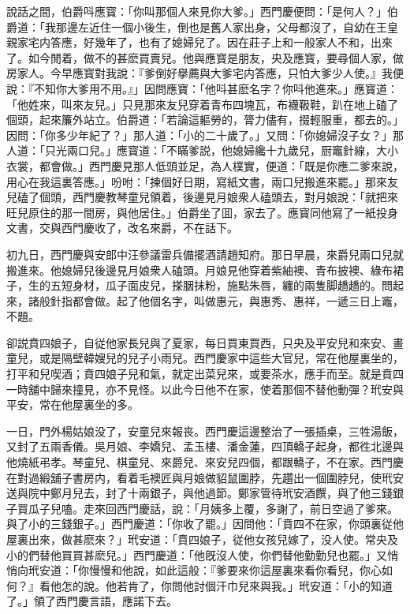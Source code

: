 說話之間，伯爵呌應寳：「你叫那個人來見你大爹。」西門慶便問：「是何人？」伯爵道：「我那邊左近住一個小後生，倒也是舊人家出身，父母都沒了，自幼在王皇親家宅内答應，好幾年了，也有了媳婦兒了。因在莊子上和一般家人不和，出來了。如今閒着，做不的甚麽買賣兒。他與應寳是朋友，央及應寳，要尋個人家，做房家人。今早應寳對我說：『爹倒好擧薦與大爹宅内答應，只怕大爹少人使。』我便說：『不知你大爹用不用。』」因問應寶：「他呌甚麽名字？你呌他進來。」應寳道：「他姓來，叫來友兒。」只見那來友兒穿着青布四塊瓦，布襪靸鞋，趴在地上磕了個頭，起來簾外站立。伯爵道：「若論這軀勞的，膂力儘有，掇輕服重，都去的。」因問：「你多少年紀了？」那人道：「小的二十歲了。」又問：「你媳婦沒子女？」那人道：「只光兩口兒。」應寳道：「不瞞爹説，他媳婦纔十九歲兒，厨竈針線，大小衣裳，都會做。」西門慶見那人低頭並足，為人樸實，便道：「既是你應二爹來說，用心在我這裏答應。」吩咐：「揀個好日期，寫紙文書，兩口兒搬進來罷。」那來友兒磕了個頭，西門慶教琴童兒領着，後邊見月娘衆人磕頭去，對月娘說：「就把來旺兒原住的那一間房，與他居住。」伯爵坐了囬，家去了。應寳同他寫了一紙投身文書，交與西門慶收了，改名來爵，不在話下。

初九日，西門慶與安郎中汪參議雷兵備擺酒請趙知府。那日早晨，來爵兒兩口兒就搬進來。他媳婦兒後邊見月娘衆人磕頭。月娘見他穿着紫紬襖、青布披襖、綠布裙子，生的五短身材，瓜子面皮兒，搽胭抹粉，施點朱唇，纏的兩隻脚趫趫的。問起來，諸般針指都會做。起了他個名字，叫做惠元，與惠秀、惠祥，一遞三日上竈，不題。

卻説賁四娘子，自従他家長兒與了夏家，每日買東買西，只央及平安兒和來安、畫童兒，或是隔壁韓嫂兒的兒子小雨兒。西門慶家中這些大官兒，常在他屋裏坐的，打平和兒喫酒；賁四娘子兒和氣，就定出菜兒來，或要茶水，應手而至。就是賁四一時舖中歸來撞見，亦不見怪。以此今日他不在家，使着那個不替他動彈？玳安與平安，常在他屋裏坐的多。

一日，門外楊姑娘没了，安童兒來報丧。西門慶這邊整治了一張插桌，三牲湯飯，又封了五兩香儀。吳月娘、李嬌兒、孟玉樓、潘金蓮，四頂轎子起身，都徃北邊與他燒紙弔孝。琴童兒、棋童兒、來爵兒、來安兒四個，都跟轎子，不在家。西門慶在對過緞舖子書房内，看着毛襖匠與月娘做貂鼠圍脖，先趲出一個圍脖兒，使玳安送與院中鄭月兒去，封了十兩銀子，與他過節。鄭家管待玳安酒饌，與了他三錢銀子買瓜子兒嗑。走來回西門慶話，說：「月姨多上覆，多謝了，前日空過了爹來。與了小的三錢銀子。」西門慶道：「你收了罷。」因問他：「賁四不在家，你頭裏従他屋裏出來，做甚麽來？」玳安道：「賁四娘子，従他女孩兒嫁了，没人使。常央及小的們替他買買甚麽兒。」西門慶道：「他旣沒人使，你們替他勤勤兒也罷。」又悄悄向玳安道：「你慢慢和他說，如此這般：『爹要來你這屋裏來看你看兒，你心如何？』看他怎的說。他若肯了，你問他討個汗巾兒來與我。」玳安道：「小的知道了。」領了西門慶言語，應諾下去。

